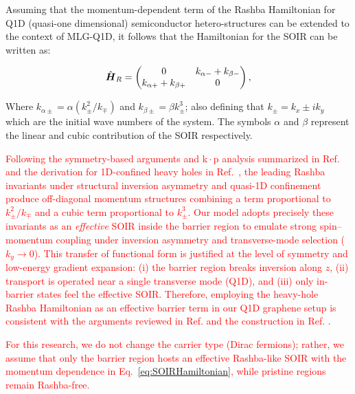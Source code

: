 Assuming that the momentum-dependent term of the Rashba Hamiltonian for Q1D (quasi-one dimensional) semiconductor hetero-structures can be extended to the context of MLG-Q1D\cite{RDiago2010, Serna2019, RCDiagoEPL2015}, it follows that the Hamiltonian for the SOIR can be written as:

\begin{equation}
    \label{eq:SOIRHamiltonian}
    \hat{\mbox{\boldmath $H$}}_R =
    \begin{pmatrix}
        0 & k_{\alpha-} + k_{\beta-} \\
        k_{\alpha+} + k_{\beta+} & 0
    \end{pmatrix},
\end{equation}

\noindent Where $k_{\alpha\pm} = \alpha\left(k_{\pm}^2/k_{\mp}\right)$ and $k_{\beta\pm} = \beta k_{\pm}^3$; also defining that $k_{\pm}=k_x\pm i k_y$ which are the initial wave numbers of the system.
The symbols $\alpha$ and $\beta$ represent the linear and cubic contribution of the SOIR respectively.

\textcolor{red}{Following the symmetry-based arguments and k\,$\cdot$\,p analysis summarized in Ref.~\cite{Serna2019} and the derivation for 1D-confined heavy holes in Ref.~\cite{RCDiagoEPL2015}, the leading Rashba invariants under structural inversion asymmetry and quasi-1D confinement produce off-diagonal momentum structures combining a term proportional to $k_{\pm}^2/k_{\mp}$ and a cubic term proportional to $k_{\pm}^3$.
Our model adopts precisely these invariants as an \emph{effective} SOIR inside the barrier region to emulate strong spin--momentum coupling under inversion asymmetry and transverse-mode selection ($k_y\!\to\!0$).
This transfer of functional form is justified at the level of symmetry and low-energy gradient expansion: (i) the barrier region breaks inversion along $z$, (ii) transport is operated near a single transverse mode (Q1D), and (iii) only in-barrier states feel the effective SOIR\@.
Therefore, employing the heavy-hole Rashba Hamiltonian as an effective barrier term in our Q1D graphene setup is consistent with the arguments reviewed in Ref. \cite{Serna2019} and the construction in Ref. \cite{RCDiagoEPL2015}.}




\textcolor{red}{For this research, we do not change the carrier type (Dirac fermions); rather, we assume that only the barrier region hosts an effective Rashba-like SOIR with the momentum dependence in Eq.~\eqref{eq:SOIRHamiltonian}, while pristine regions remain Rashba-free.}

